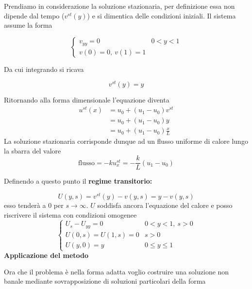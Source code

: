 \documentclass[10pt,a4paper,twoside,openright]{book}
\begin{document}
Prendiamo in considerazione la soluzione stazionaria, per definizione essa non dipende dal tempo ($\displaystyle v^{st}(y)$) e si dimentica delle condizioni iniziali. Il sistema assume la forma

\begin{equation*}
\begin{cases}
v_{yy} =0 & 0< y< 1\\
v(0) =0,\ v(1) =1 & 
\end{cases}
\end{equation*}

Da cui integrando si ricava 

\begin{equation*}
v^{st}(y) =y
\end{equation*}

\begin{nb}
Ritornando alla forma dimensionale l'equazione diventa
\begin{align*}
u^{st}(x) &=u_{0} +(u_{1} -u_{0})v^{st}\\
		& = u_{0} +(u_{1} -u_{0})y\\
		& = u_{0} +(u_{1} -u_{0}) \frac{x}{L}
\end{align*}
La soluzione stazionaria corrisponde dunque ad un flusso uniforme di calore lungo la sbarra del valore 
\begin{equation*}
\text{flusso} = -k u^{st}_{x}  = -\frac{k}{L}(u_{1} -u_{0})
\end{equation*}
\end{nb}



Definendo a questo punto il \textbf{regime transitorio:}

\begin{equation*}
U(y,s) =v^{st}(y) -v(y,s) =y-v(y,s)
\end{equation*}
esso tenderà a 0 per $\displaystyle s\rightarrow \infty $. $\displaystyle U$ soddisfa ancora l'equazione del calore e posso riscrivere il sistema con condizioni omogenee
\begin{equation*}
\boxed{\begin{cases}
U_{s} -U_{yy} =0 & 0< y< 1,\ s >0\\
U(0,s) =U(1,s) =0 & s >0\\
U(y,0) =y & 0\leqslant y\leqslant 1
\end{cases}}
\end{equation*}
\textbf{Applicazione del metodo}

Ora che il problema è nella forma adatta voglio costruire una soluzione non banale mediante sovrapposizione di soluzioni particolari della forma
\end{document}
